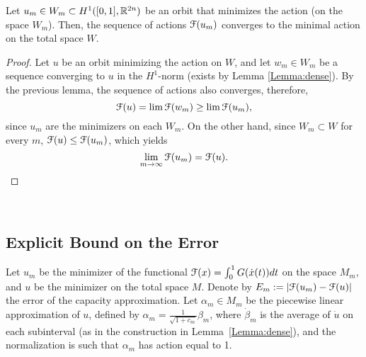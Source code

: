 \documentclass[../capacities_main.tex]{subfiles}
\begin{document}
\begin{Lemma}
	Let $u_m\in W_m\subset H^1([0,1],{\mathbb R}^{2n})$ be an orbit that minimizes the action (on the space $W_m$). Then, the sequence of actions ${\mathcal F}(u_m)$ converges to the minimal action on the total space $W$. 
\end{Lemma}

\begin{proof}
	Let $u$ be an orbit minimizing the action on $W$, and let $w_m\in W_m$ be a sequence converging to $u$ in the $H^1$-norm (exists by Lemma \autoref{Lemma:dense}). By the previous lemma, the sequence of actions also converges, therefore,
	\[
	{\mathcal F}(u)=\lim {\mathcal F}(w_m)\geq \lim {\mathcal F}(u_m),
	\]
	since $u_m$ are the minimizers on each $W_m$. On the other hand, since $W_m\subset W$ for every $m$, ${\mathcal F}(u)\leq {\mathcal F}(u_m)$, which yields 
	\[
	\lim_{m\rightarrow\infty}{\mathcal F}(u_m)={\mathcal F}(u).
	\]
\end{proof}\

\subsection{Explicit Bound on the Error}

Let $u_m$ be the minimizer of the functional ${\mathcal F}(x)=\int_0^1 G(\dot x(t))dt$ on the space $M_m$, and $u$ be the minimizer on the total space $M$. Denote by $E_m:=|{\mathcal F} (u_m)-{\mathcal F}(u)|$ the error of the capacity approximation. Let $\alpha_m\in M_m$ be the piecewise linear approximation of $u$, defined by $\alpha_m=\frac{1}{\sqrt{1+c_m}}\beta_m$, where $\dot\beta_m$ is the average of $\dot u$ on each subinterval (as in the construction in Lemma~\ref{Lemma:dense}), and the normalization is such that $\alpha_m$ has action equal to 1.
\end{document}
